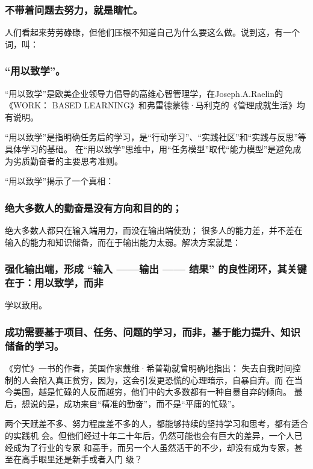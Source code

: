 \documentclass[11pt]{ctexart}
\begin{document}
{{{{\subsubsection{不带着问题去努力，就是瞎忙。}
\label{sec:org7ee5ba5}

人们看起来劳劳碌碌，但他们压根不知道自己为什么要这么做。说到这，有一个词，叫：

\subsubsection{“用以致学”。}
\label{sec:orgebda6d6}

“用以致学”是欧美企业领导力倡导的高维心智管理学，在Joseph.A.Raelin的《WORK：
BASED LEARNING》和弗雷德蒙德·马利克的《管理成就生活》均有说明。

“用以致学”是指明确任务后的学习，是“行动学习”、“实践社区”和“实践与反思”等具体学习的基础。
在“用以致学”思维中，用“任务模型”取代“能力模型”是避免成为劣质勤奋者的主要思考准则。

“用以致学”揭示了一个真相：

\subsubsection{绝大多数人的勤奋是没有方向和目的的；}
\label{sec:org4da8123}

绝大多数人都只在输入端用力，而没在输出端使劲；
很多人的能力差，并不差在输入的能力和知识储备，而在于输出能力太弱。解决方案就是：
\subsubsection{强化输出端，形成 “输入 ——输出 —— 结果” 的良性闭环，其关键在于：用以致学，而非}
\label{sec:orgf78da56}
学以致用。

\subsubsection{成功需要基于项目、任务、问题的学习，而非，基于能力提升、知识储备的学习。}
\label{sec:org8910371}

《穷忙》一书的作者，美国作家戴维·希普勒就曾明确地指出：
失去自我时间控制的人会陷入真正贫穷，因为，这会引发更恐慌的心理暗示，自暴自弃。而
在当今美国，越是忙碌的人反而越穷，他们中的大多数都有一种自暴自弃的倾向。
最后，想说的是，成功来自“精准的勤奋”，而不是“平庸的忙碌”。

两个天赋差不多、努力程度差不多的人，都能够持续的坚持学习和思考，都有适合的实践机
会。但他们经过十年二十年后，仍然可能也会有巨大的差异，一个人已经成为了行业的专家
和高手，而另一个人虽然活干的不少，却没有成为专家，甚至在高手眼里还是新手或者入门
级？

}}}}
\end{document}
